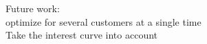 Future work: \\

optimize for several customers at a single time \\

Take the interest curve into account